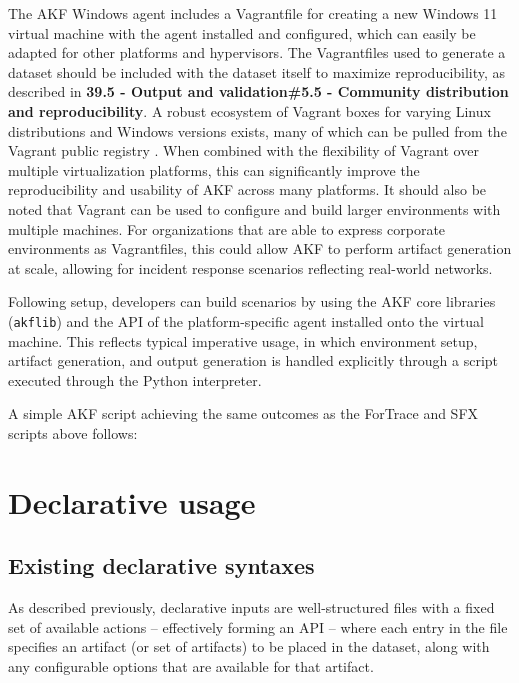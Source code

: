 \documentclass[letterpaper,12pt]{report}
\newcommand{\passthrough}[1]{#1}
\begin{document}
The AKF Windows agent includes a Vagrantfile for creating a new Windows
11 virtual machine with the agent installed and configured, which can
easily be adapted for other platforms and hypervisors. The Vagrantfiles
used to generate a dataset should be included with the dataset itself to
maximize reproducibility, as described in \textbf{39.5 - Output and
validation\#5.5 - Community distribution and reproducibility}. A robust
ecosystem of Vagrant boxes for varying Linux distributions and Windows
versions exists, many of which can be pulled from the Vagrant public
registry \cite{hashicorpHashiCorpCloudPlatform}. When combined with
the flexibility of Vagrant over multiple virtualization platforms, this
can significantly improve the reproducibility and usability of AKF
across many platforms. It should also be noted that Vagrant can be used
to configure and build larger environments with multiple machines. For
organizations that are able to express corporate environments as
Vagrantfiles, this could allow AKF to perform artifact generation at
scale, allowing for incident response scenarios reflecting real-world
networks.

Following setup, developers can build scenarios by using the AKF core
libraries (\passthrough{\lstinline!akflib!}) and the API of the
platform-specific agent installed onto the virtual machine. This
reflects typical imperative usage, in which environment setup, artifact
generation, and output generation is handled explicitly through a script
executed through the Python interpreter.

A simple AKF script achieving the same outcomes as the ForTrace and SFX
scripts above follows:

\section{Declarative usage}\label{declarative-usage}

\subsection{Existing declarative
syntaxes}\label{existing-declarative-syntaxes}

As described previously, declarative inputs are well-structured files
with a fixed set of available actions -- effectively forming an API --
where each entry in the file specifies an artifact (or set of artifacts)
to be placed in the dataset, along with any configurable options that
are available for that artifact.
\end{document}
